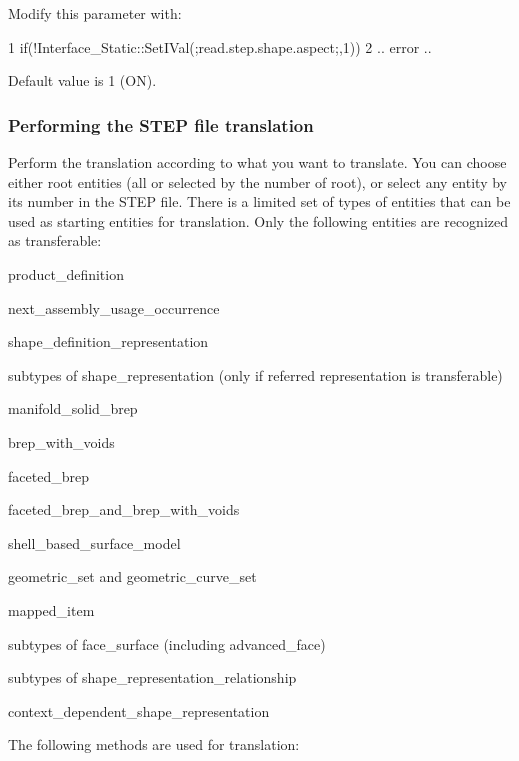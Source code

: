 Modify this parameter with\+: 
\begin{DoxyCode}
1 if(!Interface\_Static::SetIVal(;read.step.shape.aspect;,1))  
2 .. error .. 
\end{DoxyCode}
 Default value is 1 (ON).\hypertarget{occt_user_guides__step_occt_step_2_3_4}{}\subsubsection{Performing the S\+T\+E\+P file translation}\label{occt_user_guides__step_occt_step_2_3_4}
Perform the translation according to what you want to translate. You can choose either root entities (all or selected by the number of root), or select any entity by its number in the S\+T\+EP file. There is a limited set of types of entities that can be used as starting entities for translation. Only the following entities are recognized as transferable\+:
\begin{DoxyItemize}
\item product\+\_\+definition
\item next\+\_\+assembly\+\_\+usage\+\_\+occurrence
\item shape\+\_\+definition\+\_\+representation
\item subtypes of shape\+\_\+representation (only if referred representation is transferable)
\item manifold\+\_\+solid\+\_\+brep
\item brep\+\_\+with\+\_\+voids
\item faceted\+\_\+brep
\item faceted\+\_\+brep\+\_\+and\+\_\+brep\+\_\+with\+\_\+voids
\item shell\+\_\+based\+\_\+surface\+\_\+model
\item geometric\+\_\+set and geometric\+\_\+curve\+\_\+set
\item mapped\+\_\+item
\item subtypes of face\+\_\+surface (including advanced\+\_\+face)
\item subtypes of shape\+\_\+representation\+\_\+relationship
\item context\+\_\+dependent\+\_\+shape\+\_\+representation
\end{DoxyItemize}

The following methods are used for translation\+:


